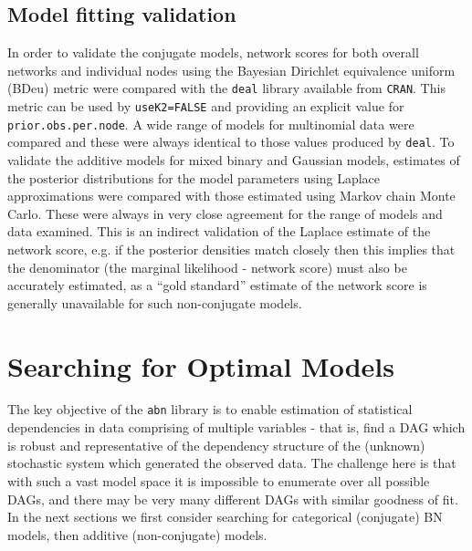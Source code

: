 \documentclass[nojss]{jss}
\begin{document}
\subsection{Model fitting validation}
In order to validate the conjugate models, network scores for both overall networks and individual nodes using the Bayesian Dirichlet equivalence uniform (BDeu) metric were compared with the {\tt deal} library available from {\tt CRAN}. This metric can be used by {\tt useK2=FALSE} and providing an explicit value for {\tt prior.obs.per.node}. A wide range of models for multinomial data were compared and these were always identical to those values produced by {\tt deal}. To validate the additive models for mixed binary and Gaussian models, estimates of the posterior distributions for the model parameters using Laplace approximations were compared with those estimated using Markov chain Monte Carlo. These were always in very close agreement for the range of models and data examined. This is an indirect validation of the Laplace estimate of the network score, e.g. if the posterior densities match closely then this implies that the denominator (the marginal likelihood - network score) must also be accurately estimated, as a ``gold standard'' estimate of the network score is generally unavailable for such non-conjugate models. 

\section{Searching for Optimal Models} \label{sec5}
The key objective of the {\tt abn} library is to enable estimation of statistical dependencies in data comprising of multiple variables - that is, find a DAG which is robust and representative of the dependency structure of the (unknown) stochastic system which generated the observed data. The challenge here is that with such a vast model space it is impossible to enumerate over all possible DAGs, and there may be very many different DAGs with similar goodness of fit. In the next sections we first consider searching for categorical (conjugate) BN models, then additive (non-conjugate) models. 
\end{document}
